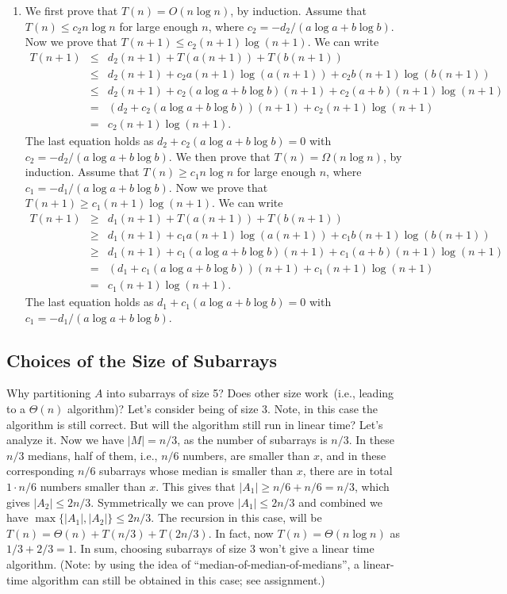 \begin{enumerate}
\item
We first prove that $T(n) = O(n\log n)$, by induction.
Assume that $T(n) \le c_2n\log n$ for large enough $n$, where $c_2 = -d_2 / (a\log a + b\log b)$.
Now we prove that $T(n + 1) \le c_2(n+1)\log (n+1)$.
We can write
\begin{eqnarray*}
T(n + 1)  & \le & d_2(n+1) + T(a(n+1)) + T(b(n+1)) \\
          & \le & d_2(n+1) + c_2a(n+1)\log (a(n+1)) + c_2b(n+1) \log (b(n+1))\\
          & \le & d_2(n+1) + c_2(a\log a + b\log b)(n+1) + c_2(a+b)(n+1)\log (n+1)\\
          & = & (d_2 + c_2(a\log a + b\log b))(n+1) + c_2(n+1)\log (n+1)\\
		  & =   & c_2(n+1)\log (n+1).
\end{eqnarray*}
The last equation holds as $d_2 + c_2(a\log a+b\log b) = 0$ with $c_2 = -d_2 / (a\log a + b\log b)$.
We then prove that $T(n) = \Omega(n\log n)$, by induction.
Assume that $T(n) \ge c_1n\log n$ for large enough $n$, where $c_1 = -d_1 / (a\log a + b\log b)$.
Now we prove that $T(n + 1) \ge c_1(n+1)\log (n+1)$.
We can write
\begin{eqnarray*}
T(n + 1)  & \ge & d_1(n+1) + T(a(n+1)) + T(b(n+1)) \\
          & \ge & d_1(n+1) + c_1a(n+1)\log (a(n+1)) + c_1b(n+1) \log (b(n+1))\\
          & \ge & d_1(n+1) + c_1(a\log a + b\log b)(n+1) + c_1(a+b)(n+1)\log (n+1)\\
          & = & (d_1 + c_1(a\log a + b\log b))(n+1) + c_1(n+1)\log (n+1)\\
		  & =   & c_1(n+1)\log (n+1).
\end{eqnarray*}
The last equation holds as $d_1 + c_1(a\log a+b\log b) = 0$ with $c_1 = -d_1 / (a\log a + b\log b)$.
\end{enumerate}


\subsection*{Choices of the Size of Subarrays}

Why partitioning $A$ into subarrays of size 5?  Does other size work~(i.e., leading to a $\Theta(n)$ algorithm)?
Let's consider being of size 3.
Note, in this case the algorithm is still correct.
But will the algorithm still run in linear time?
Let's analyze it.
Now we have $|M| = n/3$, as the number of subarrays is $n/3$.
In these $n/3$ medians, half of them, i.e., $n/6$ numbers, are smaller than $x$,
and in these corresponding $n/6$ subarrays whose median is smaller than $x$, there are in total $1\cdot n/6$ numbers smaller than $x$.
This gives that $|A_1| \ge n/6 + n/6 = n/3$, which gives $|A_2| \le 2n/3$. Symmetrically we can prove $|A_1| \le 2n/3$ and combined we have 
$\max\{|A_1|, |A_2|\} \le 2n/3$.
The recursion in this case, will be $T(n) = \Theta(n) + T(n/3) + T(2n/3)$.
In fact, now $T(n) = \Theta(n\log n)$ as $1/3 + 2/3 = 1$. 
In sum, choosing subarrays of size 3 won't give a linear time algorithm.
(Note: by using the idea of ``median-of-median-of-medians'', a linear-time
algorithm can still be obtained in this case; see assignment.)

